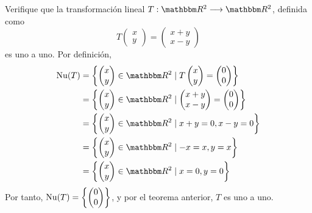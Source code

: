\begin{example}
    Verifique que la transformación lineal $T:\RR[2] \longrightarrow \RR[2]$, definida como
    $$T \begin{pmatrix}
        x \\
        y
    \end{pmatrix} = \begin{pmatrix}
        x + y \\
        x - y
    \end{pmatrix}$$
    es uno a uno. \newpage
    \solucion Por definición,
    \begin{align*}
        \Nuc(T) & = \left\{ \begin{pmatrix}
            x \\
            y
        \end{pmatrix} \in \RR[2] \mid T\begin{pmatrix}
            x \\
            y
        \end{pmatrix} = \begin{pmatrix}
            0 \\
            0
        \end{pmatrix} \right\} \\
        & = \left\{ \begin{pmatrix}
            x \\
            y
        \end{pmatrix} \in \RR[2] \mid \begin{pmatrix}
            x + y \\
            x - y
        \end{pmatrix} = \begin{pmatrix}
            0 \\
            0
        \end{pmatrix} \right\} \\
        & = \left\{ \begin{pmatrix}
            x \\
            y
        \end{pmatrix} \in \RR[2] \mid x + y = 0,  x - y = 0 \right\} \\
        & = \left\{ \begin{pmatrix}
            x \\
            y
        \end{pmatrix} \in \RR[2] \mid -x = x,  y = x \right\} \\
        & = \left\{ \begin{pmatrix}
            x \\
            y
        \end{pmatrix} \in \RR[2] \mid x = 0,  y = 0 \right\}
    \end{align*}
    Por tanto, $\displaystyle \operatorname{Nu}(T) = \left\{ \begin{pmatrix}
        0 \\
        0
    \end{pmatrix} \right\}$, y por el teorema anterior, $T$ es uno a uno.
\end{example}

